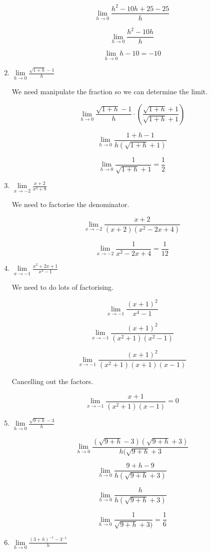 \documentclass{article}
\begin{document}
\begin{enumerate}
		$$\lim \limits _{h \to 0} \frac{h^2 - 10h + 25 - 25}{h}$$

		$$\lim \limits _{h \to 0} \frac{h^2 -10h}{h}$$

		$$\lim \limits _{h \to 0} h - 10 = -10$$

		\item $\lim \limits _{h \to 0} \frac{\sqrt{1+h} - 1}{h}$

		We need manipulate the fraction so we can determine the limit.

		$$\lim \limits _{h \to 0} \frac{\sqrt{1+h}-1}{h} \cdot (\frac{\sqrt{1+h}+1}{\sqrt{1+h}+1})$$

		$$\lim \limits _{h \to 0} \frac{1+h-1}{h(\sqrt{1+h}+1)}$$

		$$\lim \limits _{h \to 0} \frac{1}{\sqrt{1+h} +1} = \frac{1}{2}$$

		\item $\lim \limits _{x \to -2} \frac{x+2}{x^3 +8}$

		We need to factorise the denominator.

		$$\lim \limits _{x \to -2} \frac{x+2}{(x+2)(x^2 -2x +4)}$$

		$$\lim \limits _{x \to -2} \frac{1}{x^2-2x+4} = \frac{1}{12}$$

		\item $\lim \limits _{x \to -1} \frac{x^2 + 2x + 1}{x^4 - 1}$

			We need to do lots of factorising.

			$$\lim \limits _{x \to -1} \frac{(x + 1)^2}{x^4 -1}$$

			$$\lim \limits _{x \to -1} \frac{(x+1)^2}{(x^2+1)(x^2-1)}$$

			$$\lim \limits _{x \to -1} \frac{(x+1)^2}{(x^2+1)(x+1)(x-1)}$$

			Cancelling out the factors.

			$$\lim \limits _{x \to -1} \frac{x+1}{(x^2+1)(x-1)} = 0$$

		\item $\lim \limits _{h \to 0} \frac{\sqrt{9+h}-3}{h}$

			$$\lim \limits _{h \to 0} \frac{(\sqrt{9+h}-3)(\sqrt{9+h}+3)}{h(\sqrt{9+h}+3}$$

			$$\lim \limits _{h \to 0} \frac{9+h-9}{h(\sqrt{9+h}+3)}$$

			$$\lim \limits _{h \to 0} \frac{h}{h(\sqrt{9+h}+3)}$$

			$$\lim \limits _{h \to 0} \frac{1}{\sqrt{9+h}+3)} = \frac{1}{6}$$

		\item $\lim \limits _{h \to 0} \frac{(3+h)^{-1} - 3^{-1}}{h}$


\end{enumerate}
\end{document}
